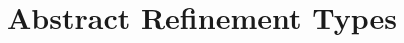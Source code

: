\chapter{Abstract Refinement Types}\label{chapter:abstractrefinements}


\renewcommand{\reft}{\ensuremath{e}\xspace}
\renewcommand{\areft}{\ensuremath{p}\xspace}
\renewcommand\rvapp[2]{\ensuremath{{#1 \ \overline{#2}}}} 
\renewcommand\tref[2]{\ensuremath{\left\lbrace \vref : #1\mid #2\right\rbrace}}
\renewcommand{\tpp}[2]{{#1 \langle #2 \rangle}}
\renewcommand\tpref[3]{\tref{\tpp{#1}{#2}}{#3}}





